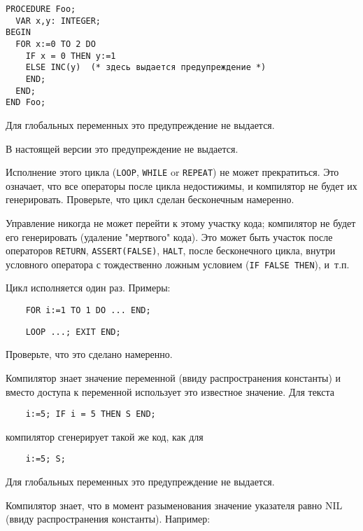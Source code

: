 \begin{verbatim}
PROCEDURE Foo;
  VAR x,y: INTEGER;
BEGIN
  FOR x:=0 TO 2 DO
    IF x = 0 THEN y:=1
    ELSE INC(y)  (* здесь выдается предупреждение *)
    END;
  END;
END Foo;
\end{verbatim}

Для глобальных переменных это предупреждение не выдается.


В настоящей версии это предупреждение не выдается.


Исполнение этого цикла (\verb'LOOP', \verb'WHILE' or \verb'REPEAT')
не может прекратиться.
Это означает, что все операторы после цикла недостижимы, и компилятор
не будет их генерировать. Проверьте, что цикл сделан бесконечным намеренно.


Управление никогда не может перейти к этому участку кода; компилятор
не будет его генерировать (удаление "мертвого" кода). 
Это может быть участок после операторов \verb'RETURN',
\verb'ASSERT(FALSE)', \verb'HALT', после бесконечного цикла,
внутри условного оператора с тождественно ложным условием
(\verb'IF FALSE THEN'), и~т.п.


Цикл исполняется один раз. Примеры:

\verb'    FOR i:=1 TO 1 DO ... END;'

\verb'    LOOP ...; EXIT END;'

Проверьте, что это сделано намеренно.


Компилятор знает значение переменной (ввиду распространения константы)
и вместо доступа к переменной использует это известное значение.
Для текста

\verb'    i:=5; IF i = 5 THEN S END;'

компилятор сгенерирует такой же код, как для

\verb'    i:=5; S;'

Для глобальных переменных это предупреждение не выдается.


Компилятор знает, что в момент разыменования значение указателя 
равно NIL (ввиду распространения константы). Например:

